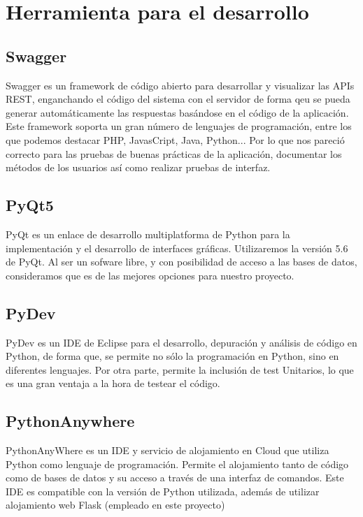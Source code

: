 \section{Herramienta para el desarrollo}
\subsection{Swagger}
Swagger es un framework de código abierto para desarrollar y visualizar las APIs REST, enganchando el código del sistema con el servidor de forma qeu se pueda generar automáticamente las respuestas basándose en el código de la aplicación. \nocite{wiki:swagger}
Este framework soporta un gran número de lenguajes de programación, entre los que podemos destacar PHP, JavasCript, Java, Python... Por lo que nos pareció correcto para las pruebas de buenas prácticas de la aplicación, documentar los métodos de los usuarios así como realizar pruebas de interfaz.\nocite{wiki:swagger} 

\subsection{PyQt5}
PyQt es un enlace de desarrollo multiplatforma de Python  \cite{python:pyqt} para la implementación y el desarrollo de interfaces gráficas. Utilizaremos la versión 5.6 de PyQt. Al ser un sofware libre, y con posibilidad de acceso a las bases de datos, consideramos que es de las mejores opciones para nuestro proyecto. \nocite{wiki:pyqt}

\subsection{PyDev}
PyDev es un IDE de Eclipse para el desarrollo, depuración y análisis de código en Python, de forma que, se permite no sólo  la programación en Python, sino en diferentes lenguajes. Por otra parte, permite la inclusión de test Unitarios, lo que es una gran ventaja a la hora de testear el código. 

\subsection{PythonAnywhere}
PythonAnyWhere es un IDE y servicio de alojamiento en Cloud que utiliza Python como lenguaje de programación. Permite el alojamiento tanto de código como de bases de datos y su acceso a través de una interfaz de comandos. Este IDE es compatible con la versión de Python utilizada, además de utilizar alojamiento web Flask (empleado en este proyecto)\nocite{wiki:pythonanywhere}


